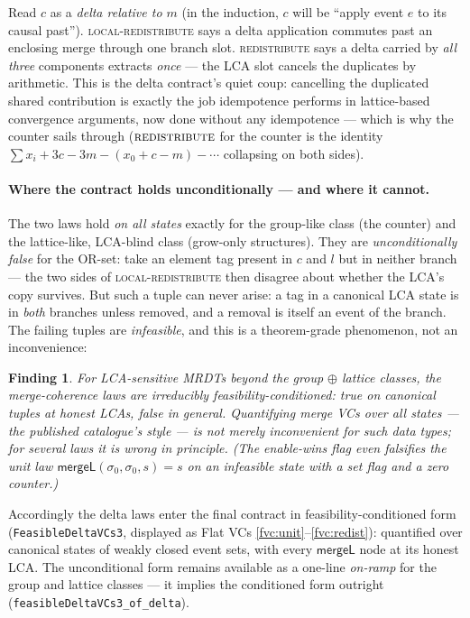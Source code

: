 \documentclass[11pt]{article}
\newtheorem*{finding}{Finding}
\newcommand{\mergeL}{\mathsf{mergeL}}
\newcommand{\Sinit}{\sigma_0}
\newcommand{\lean}[1]{\texttt{#1}}
\begin{document}
Read $c$ as a \emph{delta relative to $m$} (in the induction, $c$ will be
``apply event $e$ to its causal past''). \textsc{local-redistribute} says
a delta application commutes past an enclosing merge through one branch
slot. \textsc{redistribute} says a delta carried by \emph{all three}
components extracts \emph{once} --- the LCA slot cancels the duplicates by
arithmetic. This is the delta contract's quiet coup: cancelling the
duplicated shared contribution is exactly the job idempotence performs in
lattice-based convergence arguments, now done without any idempotence ---
which is why the
counter sails through ($\textsc{redistribute}$ for the counter is the
identity $\sum x_i + 3c - 3m - (x_0 + c - m) - \cdots$ collapsing on both
sides).

\paragraph{Where the contract holds unconditionally --- and where it
cannot.} The two laws hold \emph{on all states} exactly for the
group-like class (the counter) and the lattice-like, LCA-blind class
(grow-only structures). They are \emph{unconditionally false} for the
OR-set: take an element tag present in $c$ and $l$ but in neither branch
--- the two sides of \textsc{local-redistribute} then disagree about
whether the LCA's copy survives. But such a tuple can never arise: a tag
in a canonical LCA state is in \emph{both} branches unless removed, and a
removal is itself an event of the branch. The failing tuples are
\emph{infeasible}, and this is a theorem-grade phenomenon, not an
inconvenience:

\begin{finding}
For LCA-sensitive MRDTs beyond the group $\oplus$ lattice classes, the
merge-coherence laws are irreducibly \emph{feasibility-conditioned}: true
on canonical tuples at honest LCAs, false in general. Quantifying merge
VCs over all states --- the published catalogue's style --- is not merely
inconvenient for such data types; for several laws it is wrong in
principle. (The enable-wins flag even falsifies the \emph{unit} law
$\mergeL(\Sinit,\Sinit,s)=s$ on an infeasible state with a set flag and a
zero counter.)
\end{finding}

Accordingly the delta laws enter the final contract in
feasibility-conditioned form (\lean{FeasibleDeltaVCs3}, displayed as
Flat VCs \ref{fvc:unit}--\ref{fvc:redist}): quantified over canonical
states of weakly closed event sets, with every $\mergeL$ node at its
honest LCA. The unconditional form remains available as a one-line
\emph{on-ramp} for the group and lattice classes --- it implies the
conditioned form outright (\lean{feasibleDeltaVCs3\_of\_delta}).
\end{document}
